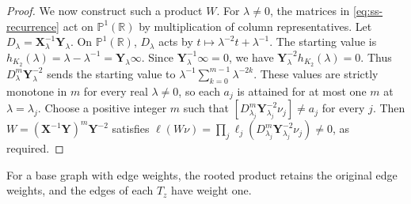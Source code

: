 \documentclass[10pt,a4paper]{article}
\theoremstyle{plain}
\theoremstyle{definition}
\newcommand{\R}{\mathbb{R}}
\begin{document}
\begin{proof}
We now construct such a product $W$.
For $\lambda\ne0$, the matrices in \cref{eq:ss-recurrence} act on
$\mathbb P^1(\R)$ by multiplication of column representatives.
Let $D_\lambda=\mathbf{X}_\lambda^{-1}\mathbf{Y}_\lambda$.
On $\mathbb P^1(\R)$, $D_\lambda$ acts by
$t\mapsto\lambda^{-2}t+\lambda^{-1}$.
The starting value is $h_{K_2}(\lambda)=\lambda-\lambda^{-1}=\mathbf{Y}_\lambda\infty$.
Since $\mathbf{Y}_\lambda^{-1}\infty=0$, we have
$\mathbf{Y}_\lambda^{-2}h_{K_2}(\lambda)=0$.
Thus $D_\lambda^m\mathbf{Y}_\lambda^{-2}$ sends the starting value to
$\lambda^{-1}\sum_{k=0}^{m-1}\lambda^{-2k}$.
These values are strictly monotone in $m$ for every real $\lambda\ne0$,
so each $a_j$ is attained for at most one $m$ at $\lambda=\lambda_j$.
Choose a positive integer $m$ such that
$[D_{\lambda_j}^m\mathbf{Y}_{\lambda_j}^{-2}\nu_j]\ne a_j$ for every $j$.
Then $W=(\mathbf{X}^{-1}\mathbf{Y})^m\mathbf{Y}^{-2}$ satisfies
$\ell(W\nu)=\prod_j\ell_j(D_{\lambda_j}^m\mathbf{Y}_{\lambda_j}^{-2}\nu_j)\ne0$,
as required.
\end{proof}

For a base graph with edge weights, the rooted product retains the
original edge weights, and the edges of each $T_z$ have weight one.
\end{document}
